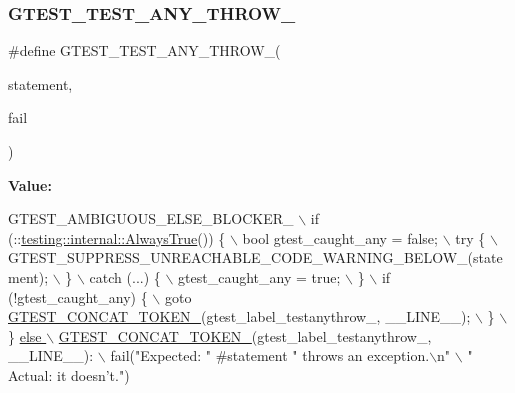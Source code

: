 \mbox{\label{gtest-internal_8h_af48bbd26d54d4afc5e4cef39b1c76ba3}} 
\subsubsection{\texorpdfstring{G\+T\+E\+S\+T\+\_\+\+T\+E\+S\+T\+\_\+\+A\+N\+Y\+\_\+\+T\+H\+R\+O\+W\+\_\+}{GTEST\_TEST\_ANY\_THROW\_}}
{\footnotesize\ttfamily \#define G\+T\+E\+S\+T\+\_\+\+T\+E\+S\+T\+\_\+\+A\+N\+Y\+\_\+\+T\+H\+R\+O\+W\+\_\+(\begin{DoxyParamCaption}\item[{}]{statement,  }\item[{}]{fail }\end{DoxyParamCaption})}

{\bfseries Value\+:}
\begin{DoxyCode}
GTEST\_AMBIGUOUS\_ELSE\_BLOCKER\_ \(\backslash\)
  if (::\hyperlink{namespacetesting_1_1internal_a4d46f09c3bfe68700b7f728d2cc3782f}{testing::internal::AlwaysTrue}()) \{ \(\backslash\)
    bool gtest\_caught\_any = \textcolor{keyword}{false}; \(\backslash\)
    try \{ \(\backslash\)
      GTEST\_SUPPRESS\_UNREACHABLE\_CODE\_WARNING\_BELOW\_(statement); \(\backslash\)
    \} \(\backslash\)
    catch (...) \{ \(\backslash\)
      gtest\_caught\_any = \textcolor{keyword}{true}; \(\backslash\)
    \} \(\backslash\)
    if (!gtest\_caught\_any) \{ \(\backslash\)
      goto \hyperlink{gtest-internal_8h_ae3c336cbe1ae2bd1b1d019333e4428a0}{GTEST\_CONCAT\_TOKEN\_}(gtest\_label\_testanythrow\_, \_\_LINE\_\_); \(\backslash\)
    \} \(\backslash\)
  \} \hyperlink{gtest-internal_8h_ae3c336cbe1ae2bd1b1d019333e4428a0}{else \(\backslash\)}
\hyperlink{gtest-internal_8h_ae3c336cbe1ae2bd1b1d019333e4428a0}{    GTEST\_CONCAT\_TOKEN\_}(gtest\_label\_testanythrow\_, \_\_LINE\_\_): \(\backslash\)
      fail(\textcolor{stringliteral}{"Expected: "} #statement \textcolor{stringliteral}{" throws an exception.\(\backslash\)n"} \(\backslash\)
           \textcolor{stringliteral}{"  Actual: it doesn't."})
\end{DoxyCode}
\mbox{\label{gtest-internal_8h_ae8912365e1d00a7a2bd248268c64aa1a}} 
